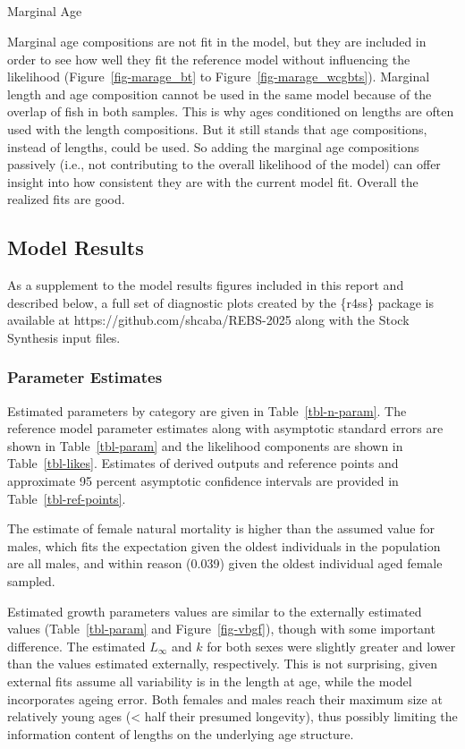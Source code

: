 \documentclass[
]{scrartcl}
\makeatletter
\let\oldsubparagraph\subparagraph
\renewcommand{\subparagraph}{
    \@ifstar
      \xxxSubParagraphStar
      \xxxSubParagraphNoStar
  }
\newcommand{\xxxSubParagraphStar}[1]{\oldsubparagraph*{#1}\mbox{}}
\newcommand{\xxxSubParagraphNoStar}[1]{\oldsubparagraph{#1}\mbox{}}
\makeatother
\begin{document}
\subparagraph{Marginal Age}\label{marginal-age}

Marginal age compositions are not fit in the model, but they are
included in order to see how well they fit the reference model without
influencing the likelihood (Figure~\ref{fig-marage_bt} to
Figure~\ref{fig-marage_wcgbts}). Marginal length and age composition
cannot be used in the same model because of the overlap of fish in both
samples. This is why ages conditioned on lengths are often used with the
length compositions. But it still stands that age compositions, instead
of lengths, could be used. So adding the marginal age compositions
passively (i.e., not contributing to the overall likelihood of the
model) can offer insight into how consistent they are with the current
model fit. Overall the realized fits are good.

\subsection{Model Results}\label{model-results}

As a supplement to the model results figures included in this report and
described below, a full set of diagnostic plots created by the \{r4ss\}
package is available at https://github.com/shcaba/REBS-2025 along with
the Stock Synthesis input files.

\subsubsection{Parameter Estimates}\label{parameter-estimates}

Estimated parameters by category are given in Table~\ref{tbl-n-param}.
The reference model parameter estimates along with asymptotic standard
errors are shown in Table~\ref{tbl-param} and the likelihood components
are shown in Table~\ref{tbl-likes}. Estimates of derived outputs and
reference points and approximate 95 percent asymptotic confidence
intervals are provided in Table~\ref{tbl-ref-points}.

The estimate of female natural mortality is higher than the assumed
value for males, which fits the expectation given the oldest individuals
in the population are all males, and within reason (0.039) given the
oldest individual aged female sampled.

Estimated growth parameters values are similar to the externally
estimated values (Table~\ref{tbl-param} and Figure~\ref{fig-vbgf}),
though with some important difference. The estimated \(L_{\infty}\) and
\(k\) for both sexes were slightly greater and lower than the values
estimated externally, respectively. This is not surprising, given
external fits assume all variability is in the length at age, while the
model incorporates ageing error. Both females and males reach their
maximum size at relatively young ages (\textless{} half their presumed
longevity), thus possibly limiting the information content of lengths on
the underlying age structure.
\end{document}
